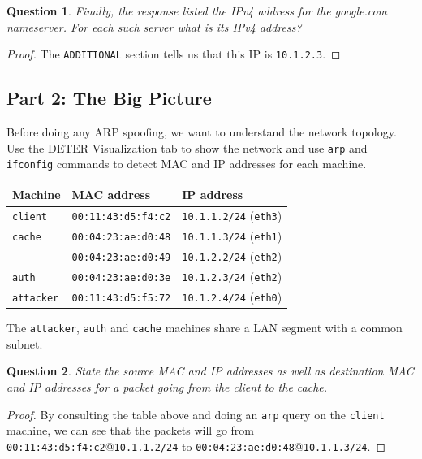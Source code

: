 \documentclass[a4paper,11pt,hidelinks]{article}
\newtheorem{theorem}{Question}[subsection]
\begin{document}
\begin{theorem}
    Finally, the response listed the IPv4 address for the google.com nameserver. For each such server what is its IPv4 address?
\end{theorem}

\begin{proof}
    The \verb=ADDITIONAL= section tells us that this IP is \verb=10.1.2.3=.
\end{proof}

\clearpage
\newpage
\subsection{Part 2: The Big Picture}

Before doing any ARP spoofing, we want to understand the network topology. Use the DETER Visualization tab to show the network and use \verb=arp= and \verb=ifconfig= commands to detect MAC and IP addresses for each machine.

\begin{table}[h!]
    \centering
    \begin{tabular}{|l|l|l|}
        \hline
        Machine                 & MAC address             & IP address                                        \\ \hline
        \verb=client= & \verb=00:11:43:d5:f4:c2= & \verb=10.1.1.2/24= (\verb=eth3=) \\ \hline
        \verb=cache= & \verb=00:04:23:ae:d0:48= & \verb=10.1.1.3/24= (\verb=eth1=) \\
                        & \verb=00:04:23:ae:d0:49= & \verb=10.1.2.2/24= (\verb=eth2=) \\ \hline
        \verb=auth= & \verb=00:04:23:ae:d0:3e= & \verb=10.1.2.3/24= (\verb=eth2=) \\ \hline
        \verb=attacker= & \verb=00:11:43:d5:f5:72= & \verb=10.1.2.4/24= (\verb=eth0=) \\ \hline
    \end{tabular}
\end{table}

The \verb=attacker=, \verb=auth= and \verb=cache= machines share a LAN segment with a common subnet.

\begin{theorem}
    State the source MAC and IP addresses as well as destination MAC and IP addresses for a packet going from the client to the cache.
\end{theorem}

\begin{proof}
    By consulting the table above and doing an \verb=arp= query on the \verb=client= machine, we can see that the packets will go from \verb=00:11:43:d5:f4:c2=@\verb=10.1.1.2/24= to \verb=00:04:23:ae:d0:48=@\verb=10.1.1.3/24=.
\end{proof}
\end{document}
